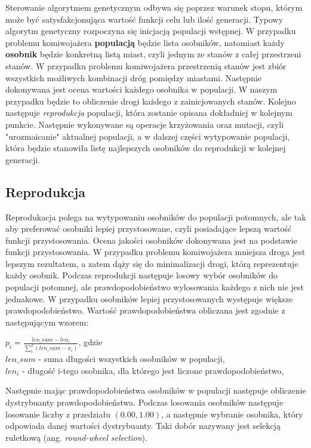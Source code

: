 \documentclass[10pt,a4paper]{article}
\begin{document}
Sterowanie algorytmem genetycznym odbywa się poprzez warunek stopu, którym może być satysfakcjonująca wartość funkcji celu lub ilość generacji. Typowy algorytm genetyczny rozpoczyna się inicjacją populacji wstępnej. W przypadku problemu komiwojażera \textbf{populacją} będzie lista osobników, natomiast każdy \textbf{osobnik} będzie konkretną listą miast, czyli jednym ze stanów z całej przestrzeni stanów. W przypadku problemu komiwojażera przestrzenią stanów jest zbiór wszystkich możliwych kombinacji dróg pomiędzy miastami. Następnie dokonywana jest ocena wartości każdego osobnika w populacji. W naszym przypadku będzie to obliczenie drogi każdego z zainicjowanych stanów. Kolejno następuje \textit{reprodukcja} populacji, która zostanie opisana dokładniej w kolejnym punkcie. Następnie wykonywane są operacje krzyżowania oraz mutacji, czyli "urozmaicanie" aktualnej populacji, a w dalszej części wytypowanie populacji, która będzie stanowiła listę najlepszych osobników do reprodukcji w kolejnej generacji.

\subsection{Reprodukcja}
Reprodukacja polega na wytypowaniu osobników do populacji potomnych, ale tak aby preferować osobniki lepiej przystosowane, czyli posiadające lepszą wartość funkcji przystosowania. Ocena jakości osobników dokonywana jest na podstawie funkcji przystosowania. W przypadku problemu komiwojażera mniejsza droga jest lepszym rezultatem, a zatem dąży się do minimalizacji drogi, którą reprezentuje każdy osobnik. Podczas reprodukcji następuje losowy wybór osobników do populacji potomnej, ale prawdopodobieństwo wylosowania każdego z nich nie jest jednakowe. W przypadku osobników lepiej przystosowanych występuje większe prawdopodobieństwo. Wartość prawdopodobieństwa obliczana jest zgodnie z następującym wzorem: 

$p_i = \frac{len\_sum - len_i}{\sum_{i}^{I} (len\_sum - x_i)}$, gdzie \\ 
$len\_sum$ - suma długości wszystkich osobników w populacji, \\
$len_i$ - długość i-tego osobnika, dla którego jest liczone prawdopodobieństwo,

Następnie mając prawdopodobieństwa osobników w populacji następuje obliczenie dystrybuanty prawdopodobieństwa. Podczas losowania osobników następuje losowanie liczby z przedziału $(0.00, 1.00)$, a następnie wybranie osobnika, który odpowiada danej wartości dystrybuanty. Taki dobór nazywany jest selekcją ruletkową (ang. \textit{round-wheel selection}).
\end{document}
